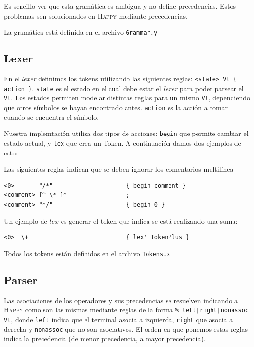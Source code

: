 Es sencillo ver que esta gram\'atica es ambigua y no define precedencias. 
Estos problemas son solucionados en \textsc{Happy} mediante precedencias.

La gram\'atica est\'a definida en el archivo \texttt{Grammar.y}

\subsection{Lexer}

En el \textit{lexer} definimos los tokens utilizando las siguientes reglas:
\texttt{<state> Vt \{ action \}}. \texttt{state} es el estado en el cual debe estar
el \textit{lexer} para poder parsear el \texttt{Vt}. Los estados permiten modelar distintas
reglas para un mismo \texttt{Vt}, dependiendo que otros s\'imbolos se hayan encontrado
antes. \texttt{action} es la acci\'on a tomar cuando se encuentra el s\'imbolo.

Nuestra implemtaci\'on utiliza dos tipos de acciones: \texttt{begin} que permite
cambiar el estado actual, y \texttt{lex} que crea un Token. A continuaci\'on damos
dos ejemplos de esto:

Las siguientes reglas indican que se deben ignorar los comentarios multil\'inea

\begin{verbatim}
<0>       "/*"                     { begin comment }
<comment> [^ \* ]*                 ;
<comment> "*/"                     { begin 0 }
\end{verbatim}

Un ejemplo de $lex$ es generar el token que indica se est\'a realizando una
suma:

\begin{verbatim}
<0>  \+                            { lex' TokenPlus }
\end{verbatim}

Todos los tokens est\'an definidos en el archivo \texttt{Tokens.x}


\subsection{Parser}

Las asociaciones de los operadores y sus precedencias se resuelven 
indicando a \textsc{Happy} como son las mismas mediante reglas de la forma
\texttt{\% left|right|nonassoc  Vt}, donde \texttt{left} indica que el terminal asocia a izquierda,
\texttt{right} que asocia a derecha y \texttt{nonassoc} que no son asociativos. El orden en que
ponemos estas reglas indica la precedencia (de menor precedencia, a mayor precedencia).

